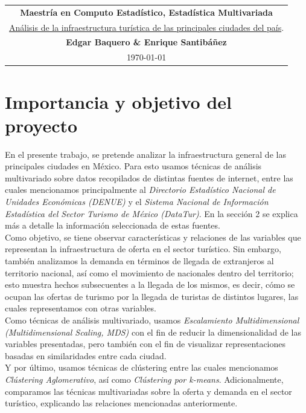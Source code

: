 \documentclass[11pt,letterpaper]{article}
\begin{document}
\begin{table}[ht]
\centering
\begin{tabular}{c}
\textbf{Maestría en Computo Estadístico, Estadística Multivariada}\\
\href{https://github.com/Enriquesec/Analisis-de-la-infraestructura-turistica-de-las-principales-ciudades-del-pais.}{Análisis de la infraestructura turística de las principales ciudades del país}.\\
\textbf{Edgar Baquero \& Enrique Santibáñez}\\
\today
\end{tabular}
\end{table}

\section{Importancia y objetivo del proyecto}
En el presente trabajo, se pretende analizar la infraestructura general de las principales ciudades en México. Para esto usamos técnicas de análisis multivariado sobre datos recopilados de distintas fuentes de internet, entre las cuales mencionamos principalmente al \textit{Directorio Estadístico Nacional de Unidades Económicas (DENUE)} y el \textit{Sistema Nacional de Información Estadística del Sector Turismo de México (DataTur)}. En la sección 2 se explica más a detalle la información seleccionada de estas fuentes.\\

Como objetivo, se tiene observar características y relaciones de las variables que representan la infraestructura de oferta en el sector turístico. Sin embargo, también analizamos la demanda en términos de llegada de extranjeros al territorio nacional, así como el movimiento de nacionales dentro del territorio; esto muestra hechos subsecuentes a la llegada de los mismos, es decir, cómo se ocupan las ofertas de turismo por la llegada de turistas de distintos lugares, las cuales representamos con otras variables.\\

Como técnicas de análisis multivariado, usamos \textit{Escalamiento Multidimensional (Multidimensional Scaling, MDS)} con el fin de reducir la dimensionalidad de las variables presentadas, pero también con el fin de visualizar representaciones basadas en similaridades entre cada ciudad.\\

Y por último, usamos técnicas de clústering entre las cuales mencionamos \textit{Clústering Aglomerativo}, así como \textit{Clústering por k-means}. Adicionalmente, comparamos las técnicas multivariadas sobre la oferta y demanda en el sector turístico, explicando las relaciones mencionadas anteriormente.
\end{document}

